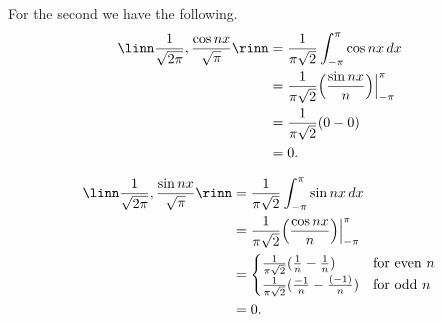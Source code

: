 \documentclass[12pt, letterpaper]{hmcpset}
\begin{document}
\begin{solution}
	For the second we have the following.
	\[
		\begin{split}
			\linn \frac{1}{\sqrt{2 \pi}}, \frac{\cos{nx}}{\sqrt{\pi}} \rinn  & = \frac{1}{\pi \sqrt 2}\int_{-\pi}^\pi \cos{nx} \, dx \\
											 & = \frac{1}{\pi \sqrt 2} \Big ( \frac{\sin{nx}}{n} \Big ) \Big |_{-\pi}^\pi \\
											 & = \frac{1}{\pi \sqrt 2} (0 - 0) \\
											 & = 0.
		\end{split}
	\]

	\[
		\begin{split}
			\linn \frac{1}{\sqrt{2 \pi}}, \frac{\sin{nx}}{\sqrt \pi} \rinn & = \frac{1}{\pi \sqrt 2} \int_{-\pi}^\pi \sin{nx} \, dx \\
										       & = \frac{1}{\pi \sqrt 2} \Big ( \frac{\cos{nx}}{n} \Big ) \Big |_{- \pi}^\pi \\
										       & = \begin{cases}
											       \frac{1}{\pi \sqrt 2} (\frac{1}{n} - \frac{1}{n}) & \text{for even } n \\
											       \frac{1}{\pi \sqrt 2} (\frac{-1}{n} - \frac{(-1)}{n}) & \text{for odd } n
										       \end{cases} \\
										       & = 0.
		\end{split}
	\]


\end{solution}
\end{document}

